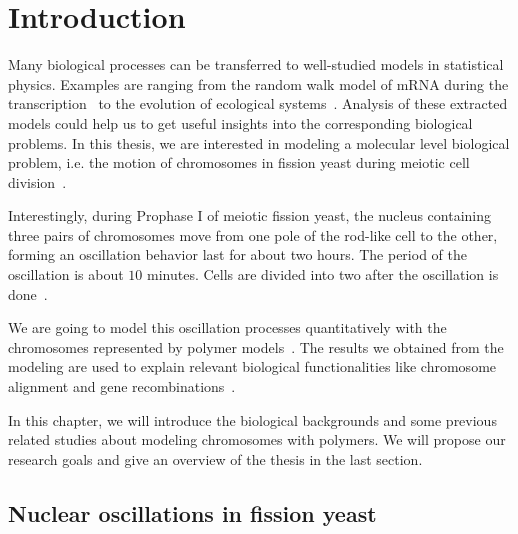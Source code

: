 
\chapter{Introduction}  %
\graphicspath{{Chapter1/Figs/}}


Many biological processes can be transferred to well-studied models in statistical physics. Examples are ranging from the random walk model of mRNA during the transcription~\cite{Macdonald1968,Bressloff2013,Chou2011} to the evolution of ecological systems~\cite{Berryman1992,Butler2009,Sugihara2012,Williams2016a}. Analysis of these extracted models could help us to get useful insights into the corresponding biological problems. In this thesis, we are interested in modeling a molecular level biological problem, i.e. the motion of chromosomes in fission yeast during meiotic cell division~\cite{Chikashige1994,Vogel2009,Shibuya2014}.

Interestingly, during Prophase I of meiotic fission yeast, the nucleus containing three pairs of chromosomes move from one pole of the rod-like cell to the other, forming an oscillation behavior last for about two hours. The period of the oscillation is about $10$ minutes. Cells are divided into two after the oscillation is done~\cite{Yamamoto2001,Ding2004,Gerton2005}.

We are going to model this oscillation processes quantitatively with the chromosomes represented by polymer models~\cite{DeGennes1979,Doi1988}. The results we obtained from the modeling are used to explain relevant biological functionalities like chromosome alignment and gene recombinations~\cite{Lin2015}. 

In this chapter, we will introduce the biological backgrounds and some previous related studies about modeling chromosomes with polymers. We will propose our research goals and give an overview of the thesis in the last section. 


\section{Nuclear oscillations in fission yeast} %
\label{sec:nuclear_oscillations_in_fission_yeast}

